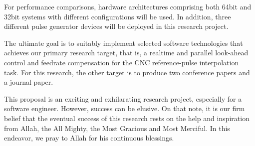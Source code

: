 For performance comparisons, hardware architectures comprising both 64bit and 32bit systems with different configurations will be used. In addition, three different pulse generator devices will be deployed in this research project. 
\vspace{0.5cm}

The ultimate goal is to suitably implement selected software technologies that achieves our primary research target, that is, a realtime and parallel look-ahead control and feedrate compensation for the CNC reference-pulse interpolation task. For this research, the other target is to produce two conference papers and a journal paper.
\vspace{0.5cm}

This proposal is an exciting and exhilarating research project, especially for a software engineer. However, success can be elusive. On that note, it is our firm belief that the eventual success of this research rests on the help and inspiration from Allah, the All Mighty, the Most Gracious and Most Merciful. In this endeavor, we pray to Allah for his continuous blessings.
\vspace{0.5cm}

